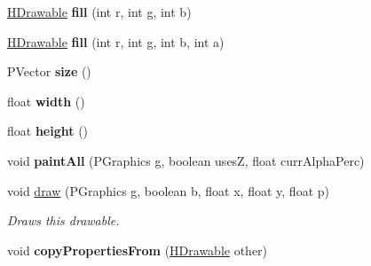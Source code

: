 \begin{DoxyCompactItemize}
\item 
\hypertarget{classhype_1_1drawable_1_1_h_stage_a55c66dfd278df300fcb6c96988dbb4da}{\hyperlink{classhype_1_1drawable_1_1_h_drawable}{H\-Drawable} {\bfseries fill} (int r, int g, int b)}\label{classhype_1_1drawable_1_1_h_stage_a55c66dfd278df300fcb6c96988dbb4da}

\item 
\hypertarget{classhype_1_1drawable_1_1_h_stage_a8ac704c5f91e673b1c7786be8cc398fd}{\hyperlink{classhype_1_1drawable_1_1_h_drawable}{H\-Drawable} {\bfseries fill} (int r, int g, int b, int a)}\label{classhype_1_1drawable_1_1_h_stage_a8ac704c5f91e673b1c7786be8cc398fd}

\item 
\hypertarget{classhype_1_1drawable_1_1_h_stage_a4d1a4833d6ab9bcfdce2f5a0d534d1ef}{P\-Vector {\bfseries size} ()}\label{classhype_1_1drawable_1_1_h_stage_a4d1a4833d6ab9bcfdce2f5a0d534d1ef}

\item 
\hypertarget{classhype_1_1drawable_1_1_h_stage_ae31a077cefbeb64d9d90cf109a3f01d9}{float {\bfseries width} ()}\label{classhype_1_1drawable_1_1_h_stage_ae31a077cefbeb64d9d90cf109a3f01d9}

\item 
\hypertarget{classhype_1_1drawable_1_1_h_stage_a1fb08f04ae51f7e7f223a1f402d59803}{float {\bfseries height} ()}\label{classhype_1_1drawable_1_1_h_stage_a1fb08f04ae51f7e7f223a1f402d59803}

\item 
\hypertarget{classhype_1_1drawable_1_1_h_stage_ae6db64ce43f05d2ccd8483d5ac6fb7b0}{void {\bfseries paint\-All} (P\-Graphics g, boolean uses\-Z, float curr\-Alpha\-Perc)}\label{classhype_1_1drawable_1_1_h_stage_ae6db64ce43f05d2ccd8483d5ac6fb7b0}

\item 
void \hyperlink{classhype_1_1drawable_1_1_h_stage_af831388904234d126dc8f5c4f2c3eb25}{draw} (P\-Graphics g, boolean b, float x, float y, float p)
\begin{DoxyCompactList}\small\item\em Draws this drawable. \end{DoxyCompactList}\item 
\hypertarget{classhype_1_1drawable_1_1_h_stage_a69b751bec2dcc691dd73c88945bb3f84}{void {\bfseries copy\-Properties\-From} (\hyperlink{classhype_1_1drawable_1_1_h_drawable}{H\-Drawable} other)}\label{classhype_1_1drawable_1_1_h_stage_a69b751bec2dcc691dd73c88945bb3f84}


\end{DoxyCompactItemize}

